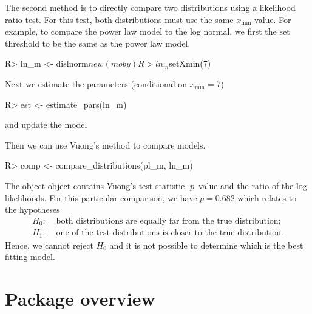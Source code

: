 \documentclass[article]{jss}
\newcommand{\xmin}{x_{\min}}
\begin{document}
The second method is to directly compare two distributions using a likelihood
ratio test. For this test, both distributions must use the same $\xmin$ value.
For example, to compare the power law model to the log normal, we first the set
threshold to be the same as the power law model.
\begin{Schunk}
\begin{Sinput}
R> ln_m <- dislnorm$new(moby)
R> ln_m$setXmin(7)
\end{Sinput}
\end{Schunk}
Next we estimate the parameters (conditional on $\xmin=7$)
\begin{Schunk}
\begin{Sinput}
R> est <- estimate_pars(ln_m) 
\end{Sinput}
\end{Schunk}
and update the model
\begin{Schunk}
\end{Schunk}
Then we can use Vuong's method to compare models.
\begin{Schunk}
\begin{Sinput}
R> comp <- compare_distributions(pl_m, ln_m)
\end{Sinput}
\end{Schunk}

The object  object contains Vuong's test statistic, $p$~value and the
ratio of the log likelihoods. For this particular comparison, we have
$p=0.682$ which relates to the hypotheses
\begin{align*}
H_0\!\!:& \text{ both distributions are equally far from the true distribution;}\\
H_1\!\!:& \text{ one of the test distributions is closer to the true distribution.}
\end{align*}
Hence, we cannot reject $H_0$ and it is not possible to determine
which is the best fitting model.

\section{Package overview }
\end{document}
